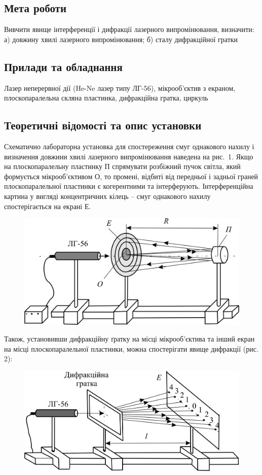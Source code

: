\documentclass[12pt]{extreport}
\begin{document}


\subsection*{Мета роботи}

Вивчити явище інтерференції і дифракції лазерного випромінювання, визначити:
а) довжину хвилі лазерного випромінювання; б) сталу дифракційної гратки

\subsection*{Прилади та обладнання}
Лазер неперервної дії (He-Ne лазер типу ЛГ-56),
мікрооб’єктив з екраном, плоскопаралельна
скляна пластинка, дифракційна гратка, циркуль

\subsection*{Теоретичні відомості та опис установки}
Схематично лабораторна установка для спостереження смуг
однакового нахилу і визначення довжини хвилі лазерного
випромінювання наведена на рис. 1.
Якщо на плоскопаралельну пластинку П спрямувати розбіжний
пучок світла, який формується мікрооб’єктивом О, то промені,
відбиті від передньої і задньої граней плоскопаралельної
пластинки є когерентними та інтерферують. Інтерференційна
картина у вигляді концентричних кілець – смуг однакового
нахилу спостерігається на екрані Е.

\begin{figure}[h]
	\centering
	\includegraphics[width=.5\textwidth]{1.png}
	\caption{}
\end{figure}

Також, установивши дифракційну ґратку на місці мікрооб'єктива
та інший екран на місці плоскопаралельної пластинки, можна
спостерігати явище дифракції (рис. 2):

\begin{figure}[h]
	\centering
	\includegraphics[width=.5\textwidth]{2.png}
	\caption{}
\end{figure}
\end{document}
